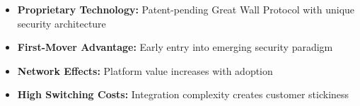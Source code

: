 \begin{itemize}
    \item \textbf{Proprietary Technology:} Patent-pending Great Wall Protocol with unique security architecture
    \item \textbf{First-Mover Advantage:} Early entry into emerging security paradigm
    \item \textbf{Network Effects:} Platform value increases with adoption
    \item \textbf{High Switching Costs:} Integration complexity creates customer stickiness
\end{itemize}


\sectionbreak